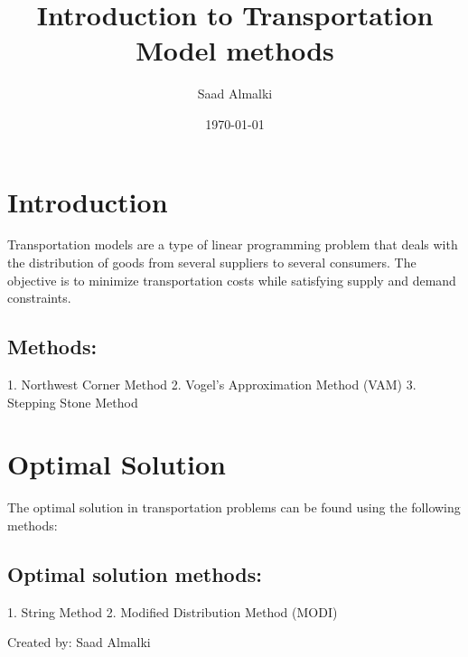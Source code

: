 \documentclass[12pt]{article}
\title{Introduction to Transportation Model methods}
\author{Saad Almalki}
\date{\today}
\begin{document}
\maketitle

\section{Introduction} 
Transportation models are a type of linear programming problem that deals with the distribution of goods from several suppliers to several consumers. The objective is to minimize transportation costs while satisfying supply and demand constraints.

\subsection{Methods:}
1. Northwest Corner Method
2. Vogel's Approximation Method (VAM)
3. Stepping Stone Method

\section{Optimal Solution}
The optimal solution in transportation problems can be found using the following methods:
\subsection{Optimal solution methods:}
1. String Method
2. Modified Distribution Method (MODI)

\begin{flushright}
Created by: Saad Almalki \\
\end{flushright}
\end{document}
